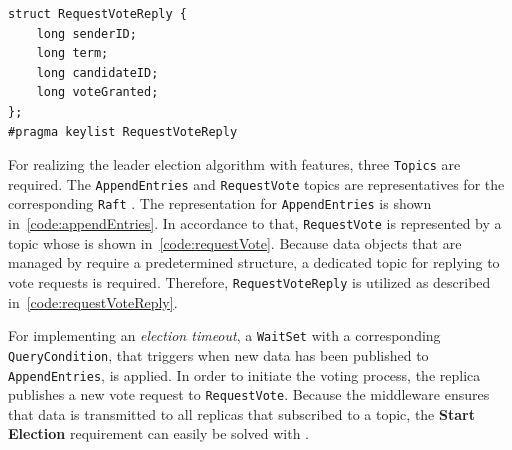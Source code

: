 \begin{lstlisting}[caption={\abr{IDL} definition for the \texttt{RequestVoteReply} topic. The \texttt{term} encodes the sender's term for the candidate to update itself. \texttt{voteGranted} shows whether the replica granted the vote request for the given term. The \texttt{candidateID} and \texttt{senderID} are used to identify which replica granted the vote for which replica respectively.}, label=code:requestVoteReply]
struct RequestVoteReply {
    long senderID;
    long term;
    long candidateID;
    long voteGranted;
};
#pragma keylist RequestVoteReply
\end{lstlisting}

For realizing the leader election algorithm with  features, three \texttt{Topics} are required.
The \texttt{AppendEntries} and \texttt{RequestVote} topics are representatives for the corresponding \texttt{Raft} .
The  representation for \texttt{AppendEntries} is shown in~\autoref{code:appendEntries}.
In accordance to that, \texttt{RequestVote} is represented by a topic whose  is shown in~\autoref{code:requestVote}.
Because data objects that are managed by  require a predetermined structure, a dedicated topic for replying to vote requests is required.
Therefore, \texttt{RequestVoteReply} is utilized as described in~\autoref{code:requestVoteReply}.

For implementing an \textit{election timeout}, a \texttt{WaitSet} with a corresponding \texttt{QueryCondition}, that triggers when new data has been published to \texttt{AppendEntries}, is applied.
In order to initiate the voting process, the replica publishes a new vote request to \texttt{RequestVote}.
Because the middleware ensures that data is transmitted to all replicas that subscribed to a topic, the \textbf{Start Election} requirement can easily be solved with .

